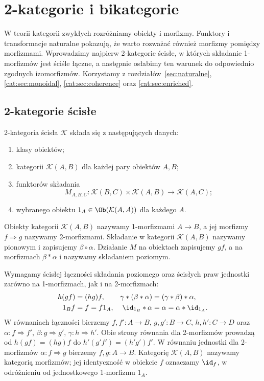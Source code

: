 \section{2-kategorie i bikategorie}\label{cat:sec:two-categories}

W teorii kategorii zwykłych rozróżniamy obiekty i morfizmy. Funktory i transformacje naturalne pokazują, że warto rozważać również morfizmy pomiędzy morfizmami. Wprowadzimy najpierw 2-kategorie ścisłe, w których składanie 1-morfizmów jest ściśle łączne, a następnie osłabimy ten warunek do odpowiednio zgodnych izomorfizmów. Korzystamy z rozdziałów~\ref{sec:naturalne}, \ref{cat:sec:monoidal}, \ref{cat:sec:coherence} oraz \ref{cat:sec:enriched}.

\subsection{2-kategorie ścisłe}

\begin{definicja}\label{cat:def:strict-two-category}
2-kategoria ścisła $\mathcal K$ składa się z następujących danych:
\begin{enumerate}
\item klasy obiektów;
\item kategorii $\mathcal K(A,B)$ dla każdej pary obiektów $A,B$;
\item funktorów składania
\[
 M_{A,B,C}:\mathcal K(B,C)\times\mathcal K(A,B)
 \longrightarrow\mathcal K(A,C);
\]
\item wybranego obiektu $1_A\in\Ob(\mathcal K(A,A))$ dla każdego $A$.
\end{enumerate}
Obiekty kategorii $\mathcal K(A,B)$ nazywamy 1-morfizmami $A\to B$, a jej morfizmy $f\Rightarrow g$ nazywamy 2-morfizmami. Składanie w kategorii $\mathcal K(A,B)$ nazywamy pionowym i zapisujemy $\beta\circ\alpha$. Działanie $M$ na obiektach zapisujemy $gf$, a na morfizmach $\beta\ast\alpha$ i nazywamy składaniem poziomym.

Wymagamy ścisłej łączności składania poziomego oraz ścisłych praw jednostki zarówno na 1-morfizmach, jak i na 2-morfizmach:
\[
\begin{aligned}
 h(gf)&=(hg)f,&
 \gamma\ast(\beta\ast\alpha)&=(\gamma\ast\beta)\ast\alpha,\\
 1_B f&=f=f1_A,&
 \id_{1_B}\ast\alpha&=\alpha=\alpha\ast\id_{1_A}.
\end{aligned}
\]
W równaniach łączności bierzemy $f,f':A\to B$, $g,g':B\to C$, $h,h':C\to D$ oraz $\alpha:f\Rightarrow f'$, $\beta:g\Rightarrow g'$, $\gamma:h\Rightarrow h'$. Obie strony równania dla 2-morfizmów prowadzą od $h(gf)=(hg)f$ do $h'(g'f')=(h'g')f'$. W równaniu jednostki dla 2-morfizmów $\alpha:f\Rightarrow g$ bierzemy $f,g:A\to B$. Kategorię $\mathcal K(A,B)$ nazywamy kategorią morfizmów; jej identyczność w obiekcie $f$ oznaczamy $\id_f$, w odróżnieniu od jednostkowego 1-morfizmu $1_A$.
\end{definicja}

